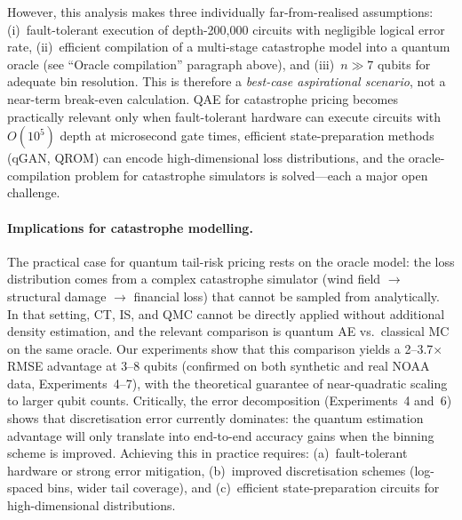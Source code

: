 \documentclass[11pt,a4paper]{article}
\begin{document}
However, this analysis makes three individually far-from-realised assumptions: (i)~fault-tolerant execution of depth-200,000 circuits with negligible logical error rate, (ii)~efficient compilation of a multi-stage catastrophe model into a quantum oracle (see ``Oracle compilation'' paragraph above), and (iii)~$n \gg 7$ qubits for adequate bin resolution. This is therefore a \emph{best-case aspirational scenario}, not a near-term break-even calculation. QAE for catastrophe pricing becomes practically relevant only when fault-tolerant hardware can execute circuits with $O(10^5)$ depth at microsecond gate times, efficient state-preparation methods (qGAN, QROM) can encode high-dimensional loss distributions, and the oracle-compilation problem for catastrophe simulators is solved---each a major open challenge.

\paragraph{Implications for catastrophe modelling.} The practical case for quantum tail-risk pricing rests on the oracle model: the loss distribution comes from a complex catastrophe simulator (wind field $\to$ structural damage $\to$ financial loss) that cannot be sampled from analytically. In that setting, CT, IS, and QMC cannot be directly applied without additional density estimation, and the relevant comparison is quantum AE vs.\ classical MC on the same oracle. Our experiments show that this comparison yields a 2--3.7$\times$ RMSE advantage at 3--8 qubits (confirmed on both synthetic and real NOAA data, Experiments~4--7), with the theoretical guarantee of near-quadratic scaling to larger qubit counts. Critically, the error decomposition (Experiments~4 and~6) shows that discretisation error currently dominates: the quantum estimation advantage will only translate into end-to-end accuracy gains when the binning scheme is improved. Achieving this in practice requires: (a)~fault-tolerant hardware or strong error mitigation, (b)~improved discretisation schemes (log-spaced bins, wider tail coverage), and (c)~efficient state-preparation circuits for high-dimensional distributions.
\end{document}
